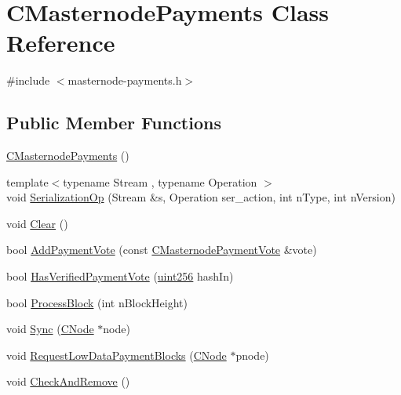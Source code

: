 \hypertarget{class_c_masternode_payments}{}\section{C\+Masternode\+Payments Class Reference}
\label{class_c_masternode_payments}


{\ttfamily \#include $<$masternode-\/payments.\+h$>$}

\subsection*{Public Member Functions}
\begin{DoxyCompactItemize}
\item 
\mbox{\hyperlink{class_c_masternode_payments_a4b9454f265a927528c881716e7649973}{C\+Masternode\+Payments}} ()
\item 
{\footnotesize template$<$typename Stream , typename Operation $>$ }\\void \mbox{\hyperlink{class_c_masternode_payments_a94644b08b8e3d359794457a0871f95cc}{Serialization\+Op}} (Stream \&s, Operation ser\+\_\+action, int n\+Type, int n\+Version)
\item 
void \mbox{\hyperlink{class_c_masternode_payments_ace5711bd6c2b17cd1e35e0924aae4268}{Clear}} ()
\item 
bool \mbox{\hyperlink{class_c_masternode_payments_a90c4db8f9eaf3749ecbed6a0840333bb}{Add\+Payment\+Vote}} (const \mbox{\hyperlink{class_c_masternode_payment_vote}{C\+Masternode\+Payment\+Vote}} \&vote)
\item 
bool \mbox{\hyperlink{class_c_masternode_payments_a3b0eff1d9f454e6451f2a290e6677b3a}{Has\+Verified\+Payment\+Vote}} (\mbox{\hyperlink{classuint256}{uint256}} hash\+In)
\item 
bool \mbox{\hyperlink{class_c_masternode_payments_aa23dfbc148f10f601e9771bfcffea441}{Process\+Block}} (int n\+Block\+Height)
\item 
void \mbox{\hyperlink{class_c_masternode_payments_adb635a5a7682a19cf235be300cd88680}{Sync}} (\mbox{\hyperlink{class_c_node}{C\+Node}} $\ast$node)
\item 
void \mbox{\hyperlink{class_c_masternode_payments_a5906c55a8c2cfa39adf14decfec87f67}{Request\+Low\+Data\+Payment\+Blocks}} (\mbox{\hyperlink{class_c_node}{C\+Node}} $\ast$pnode)
\item 
void \mbox{\hyperlink{class_c_masternode_payments_a33e0570c7554fa461f407649fb6bbbcd}{Check\+And\+Remove}} ()
\item 

\end{DoxyCompactItemize}
